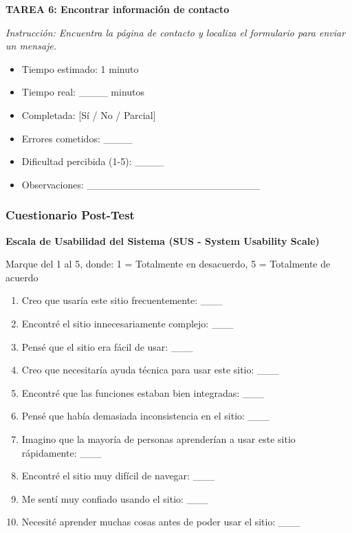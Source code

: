 \documentclass[12pt,a4paper]{article}
\begin{document}
\textbf{TAREA 6: Encontrar información de contacto}

\textit{Instrucción: Encuentra la página de contacto y localiza el formulario para enviar un mensaje.}

\begin{itemize}
    \item Tiempo estimado: 1 minuto
    \item Tiempo real: \_\_\_\_ minutos
    \item Completada: [Sí / No / Parcial]
    \item Errores cometidos: \_\_\_\_
    \item Dificultad percibida (1-5): \_\_\_\_
    \item Observaciones: \_\_\_\_\_\_\_\_\_\_\_\_\_\_\_\_\_\_\_\_\_\_\_\_
\end{itemize}

\subsubsection{Cuestionario Post-Test}

\textbf{Escala de Usabilidad del Sistema (SUS - System Usability Scale)}

Marque del 1 al 5, donde: 1 = Totalmente en desacuerdo, 5 = Totalmente de acuerdo

\begin{enumerate}
    \item Creo que usaría este sitio frecuentemente: \_\_\_
    \item Encontré el sitio innecesariamente complejo: \_\_\_
    \item Pensé que el sitio era fácil de usar: \_\_\_
    \item Creo que necesitaría ayuda técnica para usar este sitio: \_\_\_
    \item Encontré que las funciones estaban bien integradas: \_\_\_
    \item Pensé que había demasiada inconsistencia en el sitio: \_\_\_
    \item Imagino que la mayoría de personas aprenderían a usar este sitio rápidamente: \_\_\_
    \item Encontré el sitio muy difícil de navegar: \_\_\_
    \item Me sentí muy confiado usando el sitio: \_\_\_
    \item Necesité aprender muchas cosas antes de poder usar el sitio: \_\_\_
\end{enumerate}
\end{document}

